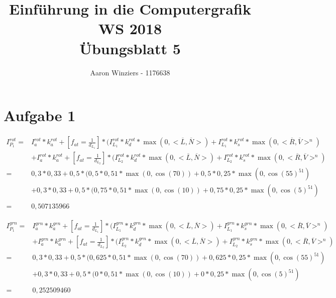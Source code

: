 \documentclass[10pt,a4paper,parskip=quarter ]{article}
\author{Aaron Winziers - 1176638}
\title{Einführung in die Computergrafik WS 2018\\\LARGE{Übungsblatt 5}}
\begin{document}
	\maketitle
	\section*{Aufgabe 1}
	
	\begin{align*}
		I^{rot}_{P_{1}} =& I^{rot}_{a}\ast k^{rot}_{a} + [f_{at} =\frac{1}{d_{L_{1}}}]\ast(I^{rot}_{L_{1}}\ast k^{rot}_{d}\ast \max(0,<\overline{L},\overline{N}>)+I^{rot}_{L_{1}}\ast k^{rot}_{s}\ast \max(0,<\overline{R},\overline{V}>^{n}) \\
		&+I^{rot}_{a}\ast k^{rot}_{a} + [f_{at} =\frac{1}{d_{L_{2}}}]\ast(I^{rot}_{L_{2}}\ast k^{rot}_{d}\ast \max(0,<\overline{L},\overline{N}>)+I^{rot}_{L_{2}}\ast k^{rot}_{s}\ast \max(0,<\overline{R},\overline{V}>^{n})\\
		=&0,3\ast0,33+0,5\ast(0,5\ast0,51\ast\max(0,\cos(70))+0,5\ast0,25\ast\max(0,\cos(55)^{51})	\\
		&+0,3\ast0,33+0,5\ast(0,75\ast0,51\ast\max(0,\cos(10))+0,75\ast0,25\ast\max(0,\cos(5)^{51})	\\	\\
		=& 0,507135966
	\end{align*}
	
	\begin{align*}
		I^{grn}_{P_{1}} =& I^{grn}_{a}\ast k^{grn}_{a} + [f_{at} =\frac{1}{d_{L_{1}}}]\ast(I^{grn}_{L_{1}}\ast k^{grn}_{d}\ast \max(0,<\overline{L},\overline{N}>)+I^{grn}_{L_{1}}\ast k^{grn}_{s}\ast \max(0,<\overline{R},\overline{V}>^{n}) \\
		&+I^{grn}_{a}\ast k^{grn}_{a} + [f_{at} =\frac{1}{d_{L_{2}}}]\ast(I^{grn}_{L_{2}}\ast k^{grn}_{d}\ast \max(0,<\overline{L},\overline{N}>)+I^{grn}_{L_{2}}\ast k^{grn}_{s}\ast \max(0,<\overline{R},\overline{V}>^{n})\\
		=&0,3\ast0,33+0,5\ast(0,625\ast0,51\ast\max(0,\cos(70))+0,625\ast0,25\ast\max(0,\cos(55)^{51})	\\
		&+0,3\ast0,33+0,5\ast(0\ast0,51\ast\max(0,\cos(10))+0\ast0,25\ast\max(0,\cos(5)^{51})	\\	\\
		=& 0,252509460
	\end{align*} 
	
\end{document}
